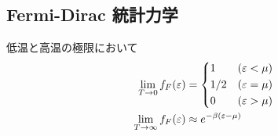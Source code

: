 \documentclass[uplatex,diffipdfmx,a4paper,11pt]{jlreq}
\theoremstyle{definition}
\begin{document}
\subsection{Fermi-Dirac 統計力学}
\begin{proposition}[低温極限と高温極限での分布関数]
  低温と高温の極限において
  \begin{align}
    \lim_{T\to 0}f_F(\varepsilon)      & = \begin{dcases}
                                             1   & (\varepsilon < \mu) \\
                                             1/2 & (\varepsilon = \mu) \\
                                             0   & (\varepsilon > \mu)
                                           \end{dcases}           \\
    \lim_{T\to \infty}f_F(\varepsilon) & \approx e^{-\beta(\varepsilon - \mu)}
  \end{align}
\end{proposition}
\end{document}

